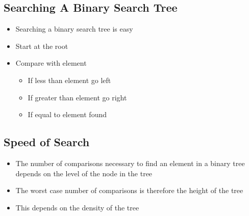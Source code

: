 \begin{slide}
\section{Searching A Binary Search Tree}

\pausebuild
\color{TwoColor}
\begin{minipage}{10cm}
  \begin{itemize}
  \item Searching a binary search tree is easy\pauseh
  \item Start at the root
    \pause
  \item Compare with element\pause
    \begin{itemize}
    \item If less than element go left
      \pause
    \item If greater than element go right
      \pause
    \item If equal to element found
      \pause
    \end{itemize}
  \end{itemize}
\end{minipage}\hspace{0.5cm}
\begin{minipage}{13cm}
\color{TextColor}
  \begin{center}
    \pause
  \end{center}
\end{minipage}
\end{slide}


\begin{slide}
\section[-1]{Speed of Search}

\begin{PauseHighLight}
  \begin{itemize}
  \item The number of comparisons necessary to find an element in a
    binary tree depends on the level of the node in the tree\pause
  \item The worst case number of comparisons is therefore the height of
    the tree\pause
  \item This depends on the density of the tree\pause
  \end{itemize}
  \begin{center}
    \pause
  \end{center}
\end{PauseHighLight}
\end{slide}


